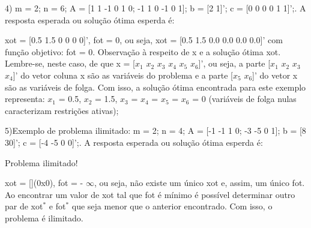 \documentclass[10pt]{article}
\begin{document}
4) m = 2; n = 6; A = [1 1 -1 0 1 0; -1 1 0 -1 0 1]; b = [2 1]'; c = [0 0 0 0 1 1]';. A resposta esperada ou solução ótima esperda é:
\newline

xot = [0.5 1.5 0 0 0 0]', fot = 0, ou seja, xot = [0.5 1.5 0.0 0.0 0.0 0.0]' com função objetivo: fot = 0.
\newline
Observação à respeito de x e a solução ótima xot. Lembre-se, neste caso, de que x = [$x_1$ $x_2$ $x_3$ $x_4$ $x_5$ $x_6$]', ou seja, a parte [$x_1$ $x_2$ $x_3$ $x_4$]' do vetor coluna x são as variáveis do problema e a parte [$x_5$ $x_6$]' do vetor x são as variáveis de folga. Com isso, a solução ótima encontrada para este exemplo representa: $x_1$ = 0.5, $x_2$ = 1.5, $x_3$ = $x_4$ = $x_5$ = $x_6$ = 0 (variáveis de folga nulas caracterizam restrições ativas);
\newline

5)Exemplo de problema ilimitado: m = 2; n = 4; A = [-1 -1 1 0; -3 -5 0 1]; b = [8 30]'; c = [-4 -5 0 0]';. A resposta esperada ou solução ótima esperda é:
\newline

Problema ilimitado!
\newline

xot = [](0x0), fot = - $\infty$, ou seja, não existe um único xot e, assim, um único fot. Ao encontrar um valor de xot tal que fot é mínimo é possível determinar outro par de xot$^{*}$ e fot$^{*}$ que seja menor que o anterior encontrado. Com isso, o problema é ilimitado.
\end{document}

